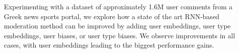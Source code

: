 Experimenting with a dataset of approximately 1.6M user comments from a Greek news sports portal, we explore how a state of the art RNN-based moderation method can be improved by adding user embeddings, user type embeddings, user biases, or user type biases. We observe improvements in all cases, with user embeddings leading to the biggest performance gains.

